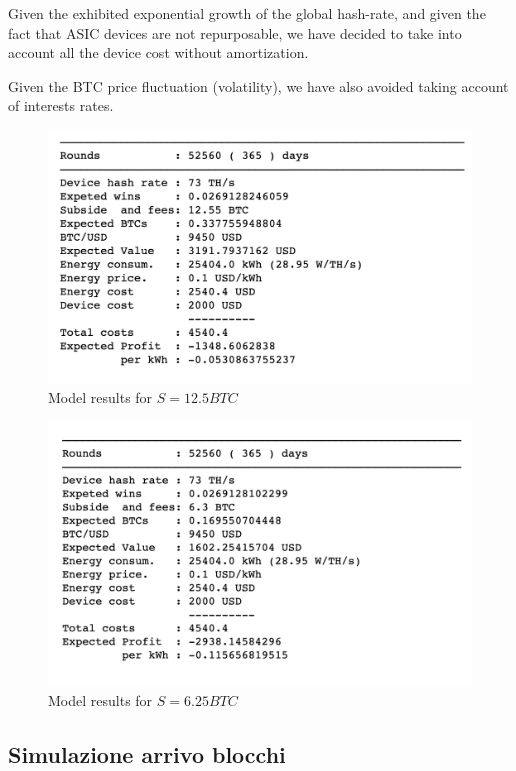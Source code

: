 \documentclass{article}
\begin{document}
Given the exhibited exponential growth of the global hash-rate, and given the fact that ASIC devices are not repurposable, we have decided to take into account all the device cost without amortization.

Given the BTC price fluctuation (volatility), we have also avoided taking account of interests rates.

\begin{figure}[ht]
    \centering
    \includegraphics[scale=0.50]{img/results-12.png}
    \caption{Model results for $S = 12.5 BTC$}
    \label{fig:results-12}
\end{figure}

\begin{figure}[ht]
    \centering
    \includegraphics[scale=0.50]{img/results.png}
    \caption{Model results for $S = 6.25 BTC$}
    \label{fig:results}
\end{figure}

\clearpage

\subsection{Simulazione arrivo blocchi}
\end{document}
